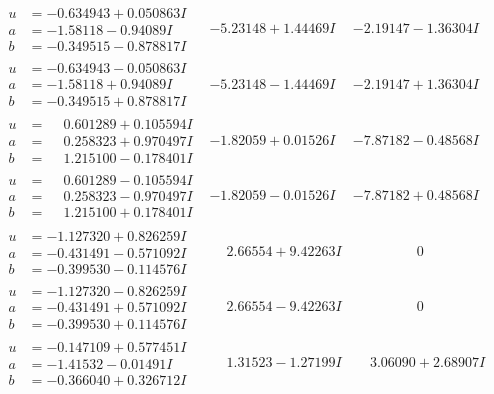 \documentclass[1p]{elsarticle_modified}
\theoremstyle{definition}
\begin{document}
$$\begin{array}{c|c|c}
\begin{aligned}
u &= -0.634943 + 0.050863 I \\
a &= -1.58118 - 0.94089 I \\
b &= -0.349515 - 0.878817 I\end{aligned}
 & -5.23148 + 1.44469 I & -2.19147 - 1.36304 I \\ \hline\begin{aligned}
u &= -0.634943 - 0.050863 I \\
a &= -1.58118 + 0.94089 I \\
b &= -0.349515 + 0.878817 I\end{aligned}
 & -5.23148 - 1.44469 I & -2.19147 + 1.36304 I \\ \hline\begin{aligned}
u &= \phantom{-}0.601289 + 0.105594 I \\
a &= \phantom{-}0.258323 + 0.970497 I \\
b &= \phantom{-}1.215100 - 0.178401 I\end{aligned}
 & -1.82059 + 0.01526 I & -7.87182 - 0.48568 I \\ \hline\begin{aligned}
u &= \phantom{-}0.601289 - 0.105594 I \\
a &= \phantom{-}0.258323 - 0.970497 I \\
b &= \phantom{-}1.215100 + 0.178401 I\end{aligned}
 & -1.82059 - 0.01526 I & -7.87182 + 0.48568 I \\ \hline\begin{aligned}
u &= -1.127320 + 0.826259 I \\
a &= -0.431491 - 0.571092 I \\
b &= -0.399530 - 0.114576 I\end{aligned}
 & \phantom{-}2.66554 + 9.42263 I & \phantom{-0.000000 } 0 \\ \hline\begin{aligned}
u &= -1.127320 - 0.826259 I \\
a &= -0.431491 + 0.571092 I \\
b &= -0.399530 + 0.114576 I\end{aligned}
 & \phantom{-}2.66554 - 9.42263 I & \phantom{-0.000000 } 0 \\ \hline\begin{aligned}
u &= -0.147109 + 0.577451 I \\
a &= -1.41532 - 0.01491 I \\
b &= -0.366040 + 0.326712 I\end{aligned}
 & \phantom{-}1.31523 - 1.27199 I & \phantom{-}3.06090 + 2.68907 I\\

\end{array}$$
\end{document}
